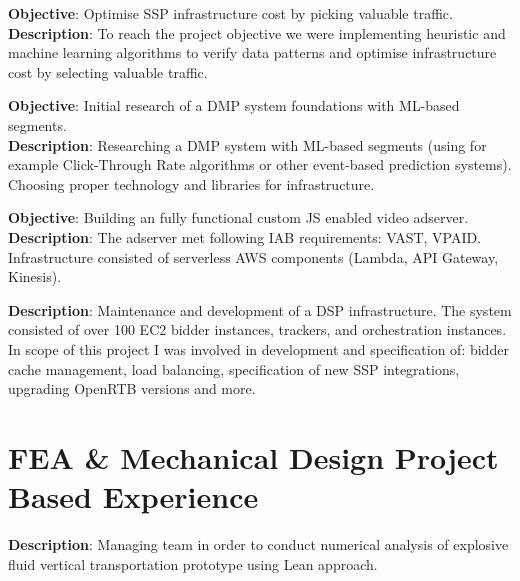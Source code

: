 \documentclass[11pt,a4paper,sans]{moderncv} %
\begin{document}
{\textbf{Objective}: Optimise SSP infrastructure cost by picking valuable traffic.\\
\textbf{Description}: To reach the project objective we were implementing heuristic and machine learning algorithms to verify data patterns and optimise infrastructure cost by selecting valuable traffic.
}

{\textbf{Objective}: Initial research of a DMP system foundations with ML-based segments.\\
\textbf{Description}: Researching a DMP system with ML-based segments (using for example Click-Through Rate algorithms or other event-based prediction systems). Choosing proper technology and libraries for infrastructure.
}

{\textbf{Objective}: Building an fully functional custom JS enabled video adserver.\\
\textbf{Description}: The adserver met following IAB requirements: VAST, VPAID. Infrastructure consisted of serverless AWS components (Lambda, API Gateway, Kinesis).
}

{\textbf{Description}: Maintenance and development of a DSP infrastructure. The system consisted of over 100 EC2 bidder instances, trackers, and orchestration instances. In scope of this project I was involved in development and specification of: bidder cache management, load balancing, specification of new SSP integrations, upgrading OpenRTB versions and more.
}


\section{FEA \& Mechanical Design Project Based Experience}
{\textbf{Description}: Managing team in order to conduct numerical analysis of explosive fluid vertical transportation prototype using Lean approach.
}
\makecvtitle
\end{document}
